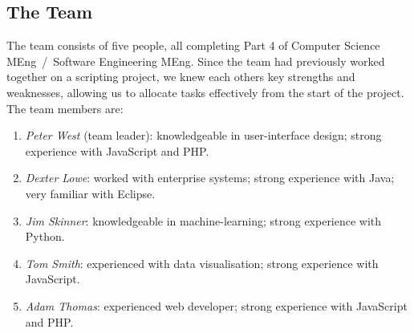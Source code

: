 \subsection{The Team}

The team consists of five people, all completing Part 4 of Computer Science MEng~/~Software Engineering MEng. Since the team had previously worked together on a scripting project, we knew each others key strengths and weaknesses, allowing us to allocate tasks effectively from the start of the project. The team members are:
\begin{enumerate}
\item \textit{Peter West} (team leader): knowledgeable in user-interface design; strong experience with JavaScript and PHP.
\item \textit{Dexter Lowe}: worked with enterprise systems; strong experience with Java; very familiar with Eclipse.
\item \textit{Jim Skinner}: knowledgeable in machine-learning; strong experience with Python.
\item \textit{Tom Smith}: experienced with data visualisation; strong experience with JavaScript.
\item \textit{Adam Thomas}: experienced web developer; strong experience with JavaScript and PHP.
\end{enumerate}

